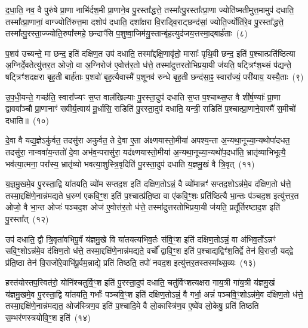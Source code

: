 द॒धा॒ति॒ नव॒ वै पुरु॑षे प्रा॒णा नाभि॑र्दश॒मी प्रा॒णाने॒व पु॒रस्ता᳚द्धत्ते॒ तस्मा᳚त्पु॒रस्ता᳚त्प्रा॒णा ज्योति॑ष्मतीमुत्त॒मामुप॑ दधाति॒ तस्मा᳚त्प्रा॒णानां॒ वाग्ज्योति॑रुत्त॒मा दशोप॑ दधाति॒ दशा᳚क्षरा वि॒राड्वि॒राट्छन्द॑सां॒ ज्योति॒र्ज्योति॑रे॒व पु॒रस्ता᳚द्धत्ते॒ तस्मा᳚त्पु॒रस्ता॒ज्ज्योति॒रुपा᳚स्महे॒ छन्दाꣳ॑सि प॒शुष्वा॒जिम॑यु॒स्तान्बृ॑ह॒त्युद॑जय॒त्तस्मा॒द्बार्\mbox{}ह॑ताः~(८)

प॒शव॑ उच्यन्ते॒ मा छन्द॒ इति॑ दक्षिण॒त उप॑ दधाति॒ तस्मा᳚द्दक्षि॒णावृ॑तो॒ मासाः᳚ पृथि॒वी छन्द॒ इति॑ प॒श्चात्प्रति॑ष्ठित्या अ॒ग्निर्दे॒वतेत्यु॑त्तर॒त ओजो॒ वा अ॒ग्निरोज॑ ए॒वोत्त॑र॒तो ध॑त्ते॒ तस्मा॑दुत्तरतोभिप्रया॒यी ज॑यति॒ षट्त्रिꣳ॑श॒थ्सं प॑द्यन्ते॒ षट्त्रिꣳ॑शदक्षरा बृह॒ती बार्\mbox{}ह॑ताः प॒शवो॑ बृह॒त्यैवास्मै॑ प॒शूनव॑ रुन्धे बृह॒ती छन्द॑सा॒ꣴ॒ स्वारा᳚ज्यं॒ परी॑याय॒ यस्यै॒ताः~(९)

उ॒प॒धी॒यन्ते॒ गच्छ॑ति॒ स्वारा᳚ज्यꣳ स॒प्त वाल॑खिल्याः पु॒रस्ता॒दुप॑ दधाति स॒प्त प॒श्चाथ्स॒प्त वै शी॑र्\mbox{}ष॒ण्याः᳚ प्रा॒णा द्वाववा᳚ञ्चौ प्रा॒णानाꣳ॑ सवीर्य॒त्वाय॑ मू॒र्धासि॒ राडिति॑ पु॒रस्ता॒दुप॑ दधाति॒ यन्त्री॒ राडिति॑ प॒श्चात्प्रा॒णाने॒वास्मै॑ स॒मीचो॑ दधाति॥~(१०)

{}%

दे॒वा वै यद्य॒ज्ञे\-ऽकु॑र्वत॒ तदसु॑रा अकुर्वत॒ ते दे॒वा ए॒ता अ॑क्ष्णयास्तो॒मीया॑ अपश्य॒न्ता अ॒न्यथा॒नूच्या॒न्यथोपा॑दधत॒ तदसु॑रा॒ नान्ववा॑य॒न्ततो॑ दे॒वा अभ॑व॒न्परासु॑रा॒ यद॑क्ष्णयास्तो॒मीया॑ अ॒न्यथा॒नूच्या॒न्यथो॑प॒दधा॑ति॒ भ्रातृ॑व्याभिभूत्यै॒ भव॑त्या॒त्मना॒ परा᳚स्य॒ भ्रातृ॑व्यो भवत्या॒शुस्त्रि॒वृदिति॑ पु॒रस्ता॒दुप॑ दधाति य॒ज्ञमु॒खं वै त्रि॒वृत्~(११)

य॒ज्ञ॒मु॒खमे॒व पु॒रस्ता॒द्वि या॑तयति॒ व्यो॑म सप्तद॒श इति॑ दक्षिण॒तो\-ऽन्नं॒ वै व्यो॑मान्नꣳ॑ सप्तद॒शो\-ऽन्न॑मे॒व द॑क्षिण॒तो ध॑त्ते॒ तस्मा॒द्दक्षि॑णे॒नान्न॑मद्यते ध॒रुण॑ एकवि॒ꣳ॒श इति॑ प॒श्चात्प्र॑ति॒ष्ठा वा ए॑कवि॒ꣳ॒शः प्रति॑ष्ठित्यै भा॒न्तः प॑ञ्चद॒श इत्यु॑त्तर॒त ओजो॒ वै भा॒न्त ओजः॑ पञ्चद॒श ओज॑ ए॒वोत्त॑र॒तो ध॑त्ते॒ तस्मा॑दुत्तरतोभिप्रया॒यी ज॑यति॒ प्रतू᳚र्तिरष्टाद॒श इति॑ पु॒रस्ता᳚त्~(१२)

उप॑ दधाति॒ द्वौ त्रि॒वृता॑वभिपू॒र्वं य॑ज्ञमु॒खे वि या॑तयत्यभिव॒र्तः स॑वि॒ꣳ॒श इति॑ दक्षिण॒तो\-ऽन्नं॒ वा अ॑भिव॒र्तो\-ऽन्नꣳ॑ सवि॒ꣳ॒शो\-ऽन्न॑मे॒व द॑क्षिण॒तो ध॑त्ते॒ तस्मा॒द्दक्षि॑णे॒नान्न॑मद्यते॒ वर्चो᳚ द्वावि॒ꣳ॒श इति॑ प॒श्चाद्यद्विꣳ॑श॒तिर्द्वे तेन॑ वि॒राजौ॒ यद्द्वे प्र॑ति॒ष्ठा तेन॑ वि॒राजो॑रे॒वाभि॑पू॒र्वम॒न्नाद्ये॒ प्रति॑ तिष्ठति॒ तपो॑ नवद॒श इत्यु॑त्तर॒तस्तस्मा᳚थ्स॒व्यः~(१३)

हस्त॑योस्तप॒स्वित॑रो॒ योनि॑श्चतुर्वि॒ꣳ॒श इति॑ पु॒रस्ता॒दुप॑ दधाति॒ चतु॑र्विꣳशत्यक्षरा गाय॒त्री गा॑य॒त्री य॑ज्ञमु॒खं य॑ज्ञमु॒खमे॒व पु॒रस्ता॒द्वि या॑तयति॒ गर्भाः᳚ पञ्चवि॒ꣳ॒श इति॑ दक्षिण॒तो\-ऽन्नं॒ वै गर्भा॒ अन्नं॑ पञ्चवि॒ꣳ॒शो\-ऽन्न॑मे॒व द॑क्षिण॒तो ध॑त्ते॒ तस्मा॒द्दक्षि॑णे॒नान्न॑मद्यत॒ ओज॑स्त्रिण॒व इति॑ प॒श्चादि॒मे वै लो॒कास्त्रि॑ण॒व ए॒ष्वे॑व लो॒केषु॒ प्रति॑ तिष्ठति स॒म्भर॑णस्त्रयोवि॒ꣳ॒श इति॑~(१४)

